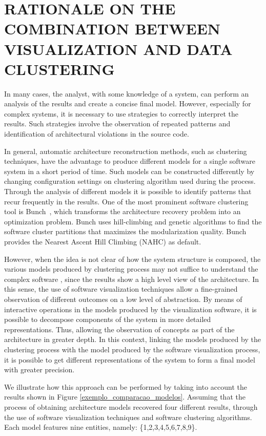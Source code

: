 \section{RATIONALE ON THE COMBINATION BETWEEN VISUALIZATION AND DATA CLUSTERING}\label{sec:rationale}%

In many cases, the analyst, with some knowledge of a system, can perform an analysis of the results and create a concise final model. However, especially for complex systems, it is necessary to use strategies to correctly interpret the results. Such strategies involve the observation of repeated patterns and identification of architectural violations in the source code.

In general, automatic architecture reconstruction methods, such as clustering techniques, have the advantage to produce different models for a single software system in a short period of time. Such models can be constructed differently by changing configuration settings on clustering algorithm used during the process. Through the analysis of different models it is possible to identify patterns that recur frequently in the results. One of the most prominent software clustering tool is Bunch~\cite{mitchell_heuristic_2002}, which transforms the architecture recovery problem into an optimization problem. Bunch uses hill-climbing and genetic algorithms to find the software cluster partitions that maximizes the modularization quality.  Bunch provides the Nearest Ascent Hill Climbing (NAHC) as default.

However, when the idea is not clear of how the system structure is composed, the various models produced by clustering process may not suffice to understand the complex software \cite{craft}, since the results show a high level view of the architecture. In this sense, the use of software visualization techniques allow a fine-grained observation of different outcomes on a low level of abstraction. By means of interactive operations in the models produced by the visualization software, it is possible to decompose components of the system in more detailed representations. Thus, allowing the observation of concepts as part of the architecture in greater depth. In this context, linking the models produced by the clustering process with the model produced by the software visualization process, it is possible to get different representations of the system to form a final model with greater precision. 

We illustrate how this approach can be performed by taking into account the results shown in Figure \ref{exemplo_comparacao_modelos}. Assuming that the process of obtaining architecture models recovered four different results, through the use of software visualization techniques and software clustering algorithms. Each model features nine entities, namely: \{1,2,3,4,5,6,7,8,9\}. 

